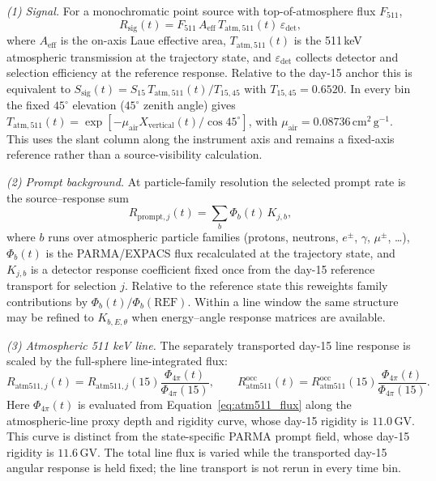 \documentclass[11pt]{article}
\begin{document}
\emph{(1) Signal.} For a monochromatic point source with top-of-atmosphere flux $F_{511}$,
\begin{equation}
  R_{\mathrm{sig}}(t)=F_{511}\,A_{\mathrm{eff}}\,T_{\mathrm{atm},511}(t)\,\varepsilon_{\mathrm{det}},
  \label{eq:mission_signal}
\end{equation}
where $A_{\mathrm{eff}}$ is the on-axis Laue effective area, $T_{\mathrm{atm},511}(t)$ is the 511\,keV atmospheric transmission at the trajectory state, and $\varepsilon_{\mathrm{det}}$ collects detector and selection efficiency at the reference response. Relative to the day-15 anchor this is equivalent to
$S_{\mathrm{sig}}(t)=S_{15}\,T_{\mathrm{atm},511}(t)/T_{15,45}$ with
$T_{15,45}=0.6520$. In every bin the fixed $45^\circ$ elevation
($45^\circ$ zenith angle) gives
$T_{\mathrm{atm},511}(t)=\exp[-\mu_{\mathrm{air}}X_{\mathrm{vertical}}(t)/\cos45^\circ]$,
with $\mu_{\mathrm{air}}=0.08736\,\mathrm{cm^2\,g^{-1}}$. This uses the
slant column along the instrument axis and remains a fixed-axis reference rather
than a source-visibility calculation.

\emph{(2) Prompt background.} At particle-family resolution the selected prompt rate is the source--response sum
\begin{equation}
  R_{\mathrm{prompt},j}(t)=\sum_{b}\Phi_{b}(t)\,K_{j,b},
  \label{eq:prompt_source_response}
\end{equation}
where $b$ runs over atmospheric particle families (protons, neutrons, $e^{\pm}$, $\gamma$, $\mu^{\pm}$, \ldots), $\Phi_{b}(t)$ is the PARMA/EXPACS flux recalculated at the trajectory state, and $K_{j,b}$ is a detector response coefficient fixed once from the day-15 reference transport for selection $j$. Relative to the reference state this reweights family contributions by $\Phi_{b}(t)/\Phi_{b}(\mathrm{REF})$. Within a line window the same structure may be refined to $K_{b,E,\theta}$ when energy--angle response matrices are available.

\emph{(3) Atmospheric 511 keV line.} The separately transported day-15 line
response is scaled by the full-sphere line-integrated flux:
\begin{equation}
  R_{\mathrm{atm511},j}(t)=R_{\mathrm{atm511},j}(15)
  \frac{\Phi_{4\pi}(t)}{\Phi_{4\pi}(15)},\qquad
  R^{\mathrm{occ}}_{\mathrm{atm511}}(t)=R^{\mathrm{occ}}_{\mathrm{atm511}}(15)
  \frac{\Phi_{4\pi}(t)}{\Phi_{4\pi}(15)}.
  \label{eq:mission_atm511}
\end{equation}
Here $\Phi_{4\pi}(t)$ is evaluated from Equation~\eqref{eq:atm511_flux} along
the atmospheric-line proxy depth and rigidity curve, whose day-15 rigidity is
$11.0\,\mathrm{GV}$. This curve is distinct from the state-specific PARMA prompt
field, whose day-15 rigidity is $11.6\,\mathrm{GV}$. The total line flux is varied
while the transported day-15 angular response is held fixed; the line transport
is not rerun in every time bin.
\end{document}
